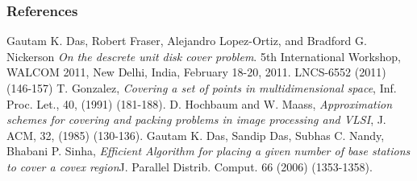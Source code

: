 \documentclass[blue]{beamer}
\begin{document}
\begin{frame}
 \frametitle{References}
 \tiny
 
 \begin{thebibliography}{10} 
  Gautam K. Das, Robert Fraser, Alejandro Lopez-Ortiz, and Bradford G. Nickerson 
                \textit{On the descrete unit disk cover problem}. 5th International Workshop, WALCOM 2011, New Delhi, 
                India, February 18-20, 2011. LNCS-6552 (2011) (146-157)
 T. Gonzalez, \textit{Covering a set of points in multidimensional space}, Inf. Proc. Let., 40, (1991) (181-188). 
 D. Hochbaum and W. Maass, \textit{Approximation schemes for covering and packing problems in image processing and VLSI}, 
         J. ACM, 32, (1985) (130-136).  
 Gautam K. Das, Sandip Das, Subhas C. Nandy, Bhabani P. Sinha, \textit{Efficient Algorithm for placing a given number of base stations to cover a covex
             region}J. Parallel Distrib. Comput. 66 (2006) (1353-1358).

 \end{thebibliography}
\end{frame}
\end{document}

